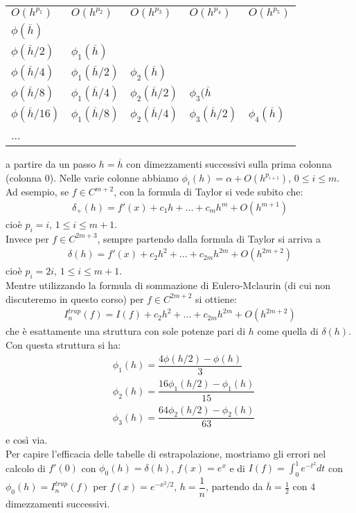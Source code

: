 \documentclass[12pt,a4paper]{article}
\begin{document}
\begin{table}[H]
\centering
\begin{tabular}{lllll}
$O(h^{p_{1}})$ & $O(h^{p_{2}})$ & $O(h^{p_{3}})$ & $O(h^{p_{4}})$ & $O(h^{p_{5}})$ \\  \cline{1-5} 

$\phi(\overline{h})$\\ 

$\phi (\overline{h}/2)$ & $\phi_1 (\overline{h})$\\

 $\phi (\overline{h}/4)$ & $\phi_1 (\overline{h}/2)$ & $\phi_2 (\overline{h})$\\
 $\phi (\overline{h}/8)$ & $\phi_1 (\overline{h}/4)$ & $\phi_2 (\overline{h}/2)$ & $\phi_3 (\overline{h}$\\
$\phi (\overline{h}/16)$ & $\phi_1 (\overline{h}/8)$ & $\phi_2 (\overline{h}/4)$ & $\phi_3 (\overline{h}/2)$ & $\phi_4 (\overline{h})$\\
	... 

\end{tabular}
\end{table}


a partire da un passo $h=\overline{h}$ con dimezzamenti successivi sulla prima colonna (colonna $0$). Nelle varie colonne abbiamo $\phi_i(h)=\alpha + O(h^{p_{i+1}})$, $0\leq i \leq m$.
Ad esempio, se $f \in C^{m+2}$, con la formula di Taylor si vede subito che:
\[ \begin{split}
	\delta_+ (h)=f'(x)+c_1h+...+c_mh^m+O(h^{m+1})
\end{split} \]
cioè $p_i=i, \, 1 \leq i \leq m+1$.\\
Invece per $f \in C^{2m+3}$, sempre partendo dalla formula di Taylor si arriva a 
\[ \begin{split}
	\delta (h)=f'(x)+c_2h^2+...+c_{2m}h^{2m}+O(h^{2m+2})
\end{split} \]
cioè $p_i=2i, \, 1 \leq i \leq m+1$.\\
Mentre utilizzando la formula di sommazione di Eulero-Mclaurin (di cui non discuteremo in questo corso) per $f \in C^{2m+2}$ si ottiene:
\[ \begin{split}
	I_n^{trap} (f)=I(f)+c_2h^2+...+c_{2m}h^{2m}+O(h^{2m+2})
\end{split} \]
che è esattamente una struttura con sole potenze pari di $h$ come quella di $\delta(h)$. Con questa struttura si ha:
\[ \begin{split}
	& \phi_1(h)=\dfrac{4 \phi(h/2)-\phi(h)}{3}\\
	& \phi_2(h)=\dfrac{16 \phi_1(h/2)-\phi_1(h)}{15}\\
	& \phi_3(h)=\dfrac{64 \phi_2(h/2)-\phi_2(h)}{63}\\
\end{split} \]
e così via.\\
Per capire l'efficacia delle tabelle di estrapolazione, mostriamo gli errori nel calcolo di $f'(0)$ con $\phi_0(h)=\delta (h)$, $f(x)=e^x$ e di $I(f)=\int_0^1 e^{-t^2} dt$ con $\phi_0(h)=I_n^{trap} (f)$ per $f(x)=e^{-x^2/2}$, $h=\dfrac{1}{n}$, partendo da $\overline{h}=\frac{1}{2}$ con $4$ dimezzamenti successivi.
\\
\end{document}
